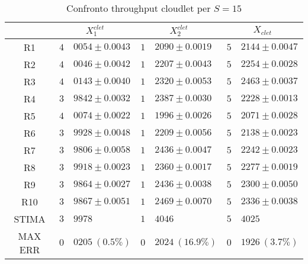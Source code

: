 \begin{table}[!h]
\begin{tabular}{c|r@{.}l|r@{.}l|r@{.}l}
& \multicolumn{2}{|c|}{$X_1^{clet}$}
& \multicolumn{2}{|c|}{$X_2^{clet}$}
& \multicolumn{2}{|c}{$X_{clet}$} 
\\          
\hline
R1      & $4$&$0054 \pm 0.0043$ & $1$&$2090 \pm 0.0019$ & $5$&$2144 \pm 0.0047$ \\
R2      & $4$&$0046 \pm 0.0042$ & $1$&$2207 \pm 0.0043$ & $5$&$2254 \pm 0.0028$ \\
R3      & $4$&$0143 \pm 0.0040$ & $1$&$2320 \pm 0.0053$ & $5$&$2463 \pm 0.0037$ \\
R4      & $3$&$9842 \pm 0.0032$ & $1$&$2387 \pm 0.0030$ & $5$&$2228 \pm 0.0013$ \\
R5      & $4$&$0074 \pm 0.0022$ & $1$&$1996 \pm 0.0026$ & $5$&$2071 \pm 0.0028$ \\
R6      & $3$&$9928 \pm 0.0048$ & $1$&$2209 \pm 0.0056$ & $5$&$2138 \pm 0.0023$ \\
R7      & $3$&$9806 \pm 0.0058$ & $1$&$2436 \pm 0.0047$ & $5$&$2242 \pm 0.0023$ \\
R8      & $3$&$9918 \pm 0.0023$ & $1$&$2360 \pm 0.0017$ & $5$&$2277 \pm 0.0019$ \\
R9      & $3$&$9864 \pm 0.0027$ & $1$&$2436 \pm 0.0038$ & $5$&$2300 \pm 0.0050$ \\
R10     & $3$&$9867 \pm 0.0051$ & $1$&$2469 \pm 0.0070$ & $5$&$2336 \pm 0.0038$ \\
STIMA   & $3$&$9978$            & $1$&$4046$            & $5$&$4025$            \\
MAX ERR & $0$&$0205 \ (0.5\%)$  & $0$&$2024 \ (16.9\%)$ & $0$&$1926 \ (3.7\%)$    
\end{tabular}
\centering
\caption{Confronto throughput cloudlet per $S=15$}
\label{tab:15_xclet}
\end{table}
